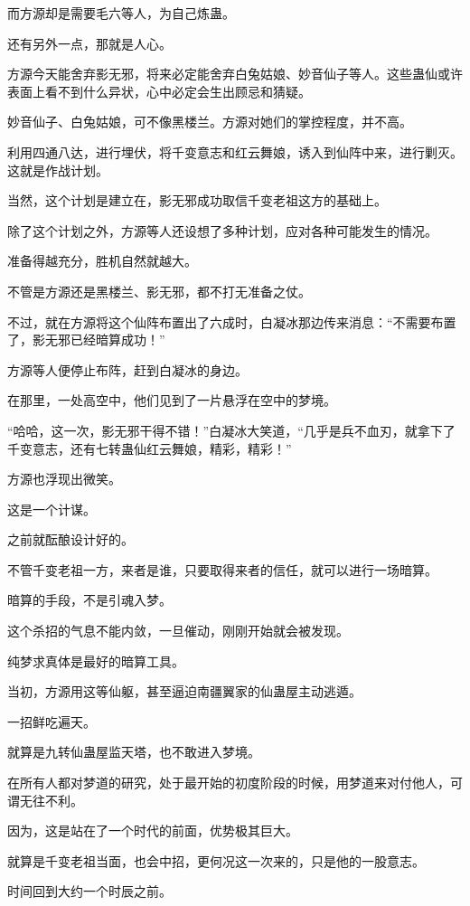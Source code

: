 \begin{this_body}
而方源却是需要毛六等人，为自己炼蛊。

还有另外一点，那就是人心。

方源今天能舍弃影无邪，将来必定能舍弃白兔姑娘、妙音仙子等人。这些蛊仙或许表面上看不到什么异状，心中必定会生出顾忌和猜疑。

妙音仙子、白兔姑娘，可不像黑楼兰。方源对她们的掌控程度，并不高。

利用四通八达，进行埋伏，将千变意志和红云舞娘，诱入到仙阵中来，进行剿灭。这就是作战计划。

当然，这个计划是建立在，影无邪成功取信千变老祖这方的基础上。

除了这个计划之外，方源等人还设想了多种计划，应对各种可能发生的情况。

准备得越充分，胜机自然就越大。

不管是方源还是黑楼兰、影无邪，都不打无准备之仗。

不过，就在方源将这个仙阵布置出了六成时，白凝冰那边传来消息：“不需要布置了，影无邪已经暗算成功！”

方源等人便停止布阵，赶到白凝冰的身边。

在那里，一处高空中，他们见到了一片悬浮在空中的梦境。

“哈哈，这一次，影无邪干得不错！”白凝冰大笑道，“几乎是兵不血刃，就拿下了千变意志，还有七转蛊仙红云舞娘，精彩，精彩！”

方源也浮现出微笑。

这是一个计谋。

之前就酝酿设计好的。

不管千变老祖一方，来者是谁，只要取得来者的信任，就可以进行一场暗算。

暗算的手段，不是引魂入梦。

这个杀招的气息不能内敛，一旦催动，刚刚开始就会被发现。

纯梦求真体是最好的暗算工具。

当初，方源用这等仙躯，甚至逼迫南疆翼家的仙蛊屋主动逃遁。

一招鲜吃遍天。

就算是九转仙蛊屋监天塔，也不敢进入梦境。

在所有人都对梦道的研究，处于最开始的初度阶段的时候，用梦道来对付他人，可谓无往不利。

因为，这是站在了一个时代的前面，优势极其巨大。

就算是千变老祖当面，也会中招，更何况这一次来的，只是他的一股意志。

时间回到大约一个时辰之前。


\end{this_body}
